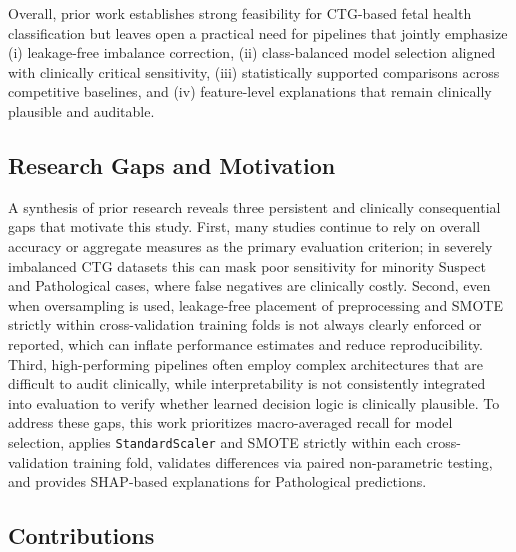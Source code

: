 \documentclass[sigconf]{acmart}
\begin{document}
Overall, prior work establishes strong feasibility for CTG-based fetal health classification but leaves open a practical need for pipelines that jointly emphasize (i) leakage-free imbalance correction, (ii) class-balanced model selection aligned with clinically critical sensitivity, (iii) statistically supported comparisons across competitive baselines, and (iv) feature-level explanations that remain clinically plausible and auditable.

\subsection{Research Gaps and Motivation}
\label{subsec:research_gaps}

A synthesis of prior research reveals three persistent and clinically consequential gaps that motivate this study. First, many studies continue to rely on overall accuracy or aggregate measures as the primary evaluation criterion; in severely imbalanced CTG datasets this can mask poor sensitivity for minority Suspect and Pathological cases, where false negatives are clinically costly. Second, even when oversampling is used, leakage-free placement of preprocessing and SMOTE strictly within cross-validation training folds is not always clearly enforced or reported, which can inflate performance estimates and reduce reproducibility. Third, high-performing pipelines often employ complex architectures that are difficult to audit clinically, while interpretability is not consistently integrated into evaluation to verify whether learned decision logic is clinically plausible. To address these gaps, this work prioritizes macro-averaged recall for model selection, applies \texttt{StandardScaler} and SMOTE strictly within each cross-validation training fold, validates differences via paired non-parametric testing, and provides SHAP-based explanations for Pathological predictions.

\subsection{Contributions}
\label{subsec:contributions}
\end{document}
